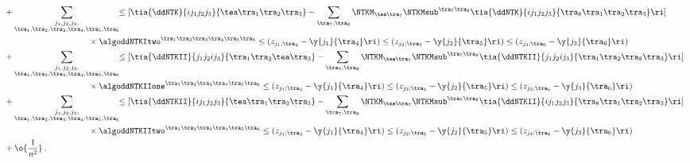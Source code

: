 \begin{align}
&+\sum_{\substack{ j_1,j_2,j_3, \\ \tra_1,\tra_2,\tra_3,\tra_4,\tra_5,\tra_6} }\!\! \le[ \tia{\ddNTK}{i j_1j_2j_3}{\tea\tra_1\tra_2\tra_3}-\sum_{\tra_7,\tra_8}\NTKM_{\tea\tra_7}\NTKMsub^{\tra_7\tra_8}\tia{\ddNTK}{i j_1j_2j_3}{\tra_8\tra_1\tra_2\tra_3}\ri] 
\notag \, \\
&\quad\quad\quad\quad\quad\quad\quad\quad\quad\quad\times \algoddNTKItwo^{\tra_1\tra_2\tra_3\tra_4\tra_5\tra_6}\le(z_{j_1;\tra_4}-\y{j_1}{\tra_4}\ri)\le(z_{j_2;\tra_5}-\y{j_2}{\tra_5}\ri)\le(z_{j_3;\tra_6}-\y{j_3}{\tra_6}\ri)\, \notag \\
&+\sum_{\substack{ j_1,j_2,j_3, \\ \tra_1,\tra_2,\tra_3,\tra_4,\tra_5,\tra_6} }\!\! \le[ \tia{\ddNTKII}{j_1 j_2ij_3}{\tra_1\tra_2\tea\tra_3}-\sum_{\tra_7,\tra_8}\NTKM_{\tea\tra_7}\NTKMsub^{\tra_7\tra_8}\tia{\ddNTKII}{j_1j_2ij_3}{\tra_1\tra_2\tra_8\tra_3}\ri] 
\notag \, \\
&\quad\quad\quad\quad\quad\quad\quad\quad\quad\quad\times \algoddNTKIIone^{\tra_1\tra_2\tra_3\tra_4\tra_5\tra_6}\le(z_{j_1;\tra_4}-\y{j_1}{\tra_4}\ri)\le(z_{j_2;\tra_5}-\y{j_2}{\tra_5}\ri)\le(z_{j_3;\tra_6}-\y{j_3}{\tra_6}\ri)\, \notag \\
&+\sum_{\substack{ j_1,j_2,j_3, \\ \tra_1,\tra_2,\tra_3,\tra_4,\tra_5,\tra_6} }\!\! \le[ \tia{\ddNTKII}{i j_1j_2j_3}{\tea\tra_1\tra_2\tra_3}-\sum_{\tra_7,\tra_8}\NTKM_{\tea\tra_7}\NTKMsub^{\tra_7\tra_8}\tia{\ddNTKII}{i j_1j_2j_3}{\tra_8\tra_1\tra_2\tra_3}\ri] 
\notag \, \\
&\quad\quad\quad\quad\quad\quad\quad\quad\quad\quad\times \algoddNTKIItwo^{\tra_1\tra_2\tra_3\tra_4\tra_5\tra_6}\le(z_{j_1;\tra_4}-\y{j_1}{\tra_4}\ri)\le(z_{j_2;\tra_5}-\y{j_2}{\tra_5}\ri)\le(z_{j_3;\tra_6}-\y{j_3}{\tra_6}\ri)\, \notag \\
&+\o{\frac{1}{n^2}} \, \notag .\end{align}
